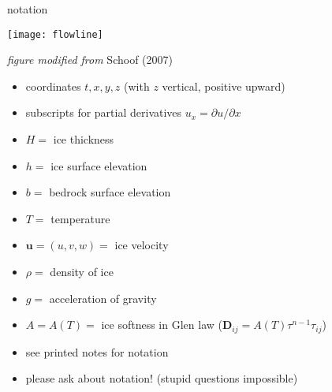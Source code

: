 \begin{comment}
\begin{frame}{outside of scope}

\large\emph{not} \normalsize covered here:\normalsize
\medskip

  \begin{itemize}
  \item Stokes and ``higher order'' flow equations
  \item thermomechanical coupling or polythermal ice
  \item subglacial hydrology/processes
  \item mass balance and snow/firn processes
  \item constitutive relations other than Glen isotropic
  \item grounding lines, calving fronts, ocean interaction
  \item paleo-climate and ``spin-up''
  \item earth deformation under ice sheet load
  \item other numerics: FEM, spectral, multigrid, parallel, \dots
  \item etc.
  \end{itemize}

\end{frame}
\end{comment}

\begin{frame}{notation} 

\begin{center}
  \texttt{[image: flowline]}

\tiny \emph{figure modified from} Schoof (2007)\nocite{SchoofMarine1}
\end{center}

\scriptsize
  \begin{itemize}
  \item coordinates $t,x,y,z$  (with $z$ vertical, positive upward)
  \item subscripts for partial derivatives $u_x = \partial u/\partial x$
  \item $H=$ ice thickness
  \item $h=$ ice surface elevation
  \item $b=$ bedrock surface elevation
  \item $T=$ temperature
  \item $\mathbf{u}=(u,v,w)=$ ice velocity
  \item $\rho=$ density of ice
  \item $g=$ acceleration of gravity
  \item $A=A(T)=$ ice softness in Glen law ($\mathbf{D}_{ij} = A(T) \tau^{n-1} \tau_{ij}$)
  \item \alert{see printed notes for notation}
  \item \alert{please ask about notation!}  (stupid questions impossible)
  \end{itemize}

\end{frame}


